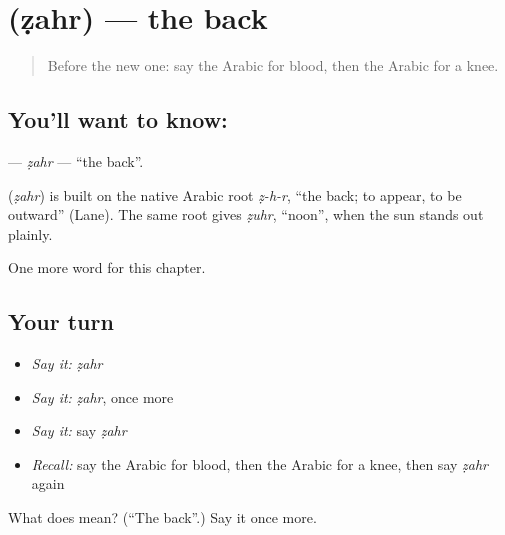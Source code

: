 \section[\texorpdfstring{\ar{ظهر} (ẓahr)}{ظهر (ẓahr)}]{ (ẓahr) — the back}

\label{lesson:AR-C52-zahr}



\begin{quote}
Before the new one: say the Arabic for blood, then the Arabic for a knee.
\end{quote}

\subsection*{You'll want to know: }
\textbf{} — \emph{ẓahr} — \textquotedblleft{}the back\textquotedblright{}.

\begin{cousinweb}
\textbf{} (\emph{ẓahr}) is built on the native Arabic root \emph{ẓ-h-r}, \textquotedblleft{}the back; to appear, to be outward\textquotedblright{} (Lane). The same root gives \emph{ẓuhr}, \textquotedblleft{}noon\textquotedblright{}, when the sun stands out plainly.
\end{cousinweb}

\begin{grammarlens}[title={What you've built}]
One more word for this chapter.
\end{grammarlens}

\subsection*{Your turn}
\begin{itemize}
\raggedright
  \item \emph{Say it:} \emph{ẓahr}
  \item \emph{Say it:} \emph{ẓahr}, once more
  \item \emph{Say it:} say \emph{ẓahr}
  \item \emph{Recall:} say the Arabic for blood, then the Arabic for a knee, then say \emph{ẓahr} again
\end{itemize}

\begin{tcolorbox}[breakable,colback=teal!4,colframe=teal!35!black,title={Before you move on}]
What does  mean? (\textquotedblleft{}The back\textquotedblright{}.) Say it once more.
\end{tcolorbox}

